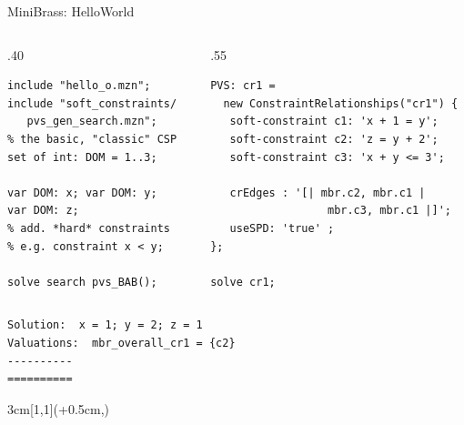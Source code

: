 \begin{frame}[fragile]{MiniBrass: HelloWorld}
\begin{columns}[onlytextwidth,T]
    
    \begin{column}{.40\textwidth}
          
    \begin{lstlisting}
include "hello_o.mzn"; 
include "soft_constraints/
   pvs_gen_search.mzn"; 
% the basic, "classic" CSP 
set of int: DOM = 1..3;

var DOM: x; var DOM: y; 
var DOM: z;
% add. *hard* constraints
% e.g. constraint x < y;

solve search pvs_BAB();
\end{lstlisting}
    \end{column}
    
    \begin{column}{.55\textwidth}
  	\begin{lstlisting}
PVS: cr1 = 
  new ConstraintRelationships("cr1") {
   soft-constraint c1: 'x + 1 = y';
   soft-constraint c2: 'z = y + 2';
   soft-constraint c3: 'x + y <= 3';
   
   crEdges : '[| mbr.c2, mbr.c1 | 
                  mbr.c3, mbr.c1 |]';
   useSPD: 'true' ;
}; 

solve cr1;
\end{lstlisting}

    \end{column}
  \end{columns}
  \pause
  \begin{verbatim}
Solution:  x = 1; y = 2; z = 1
Valuations:  mbr_overall_cr1 = {c2}
----------
==========
  \end{verbatim}
  \begin{textblock*}{3cm}[1,1](\textwidth+0.5cm,\textheight-0.3cm)
\begin{center}
\end{center}
\end{textblock*}
\end{frame}

